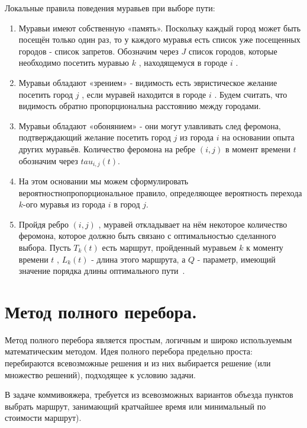 \documentclass[12pt]{report}
\begin{document}
    Локальные правила поведения муравьев при выборе пути:
    \begin{enumerate}
    	\item Муравьи имеют собственную «память». Поскольку каждый город может быть посещён только один раз, то у каждого муравья есть список уже посещенных городов - список запретов. Обозначим через $J$ список городов, которые необходимо посетить муравью $k$ , находящемуся в городе $i$ .
    	
    	\item Муравьи обладают «зрением» - видимость есть эвристическое желание посетить город $j$ , если муравей находится в городе $i$ . Будем считать, что видимость обратно пропорциональна расстоянию между городами.
    	
    	\item Муравьи обладают «обонянием» - они могут улавливать след феромона, подтверждающий желание посетить город $j$ из города $i$ на основании опыта других муравьёв. Количество феромона на ребре $(i,j)$ в момент времени $t$ обозначим через $tau _{i,j} (t)$.
    	
    	\item На этом основании мы можем сформулировать вероятностнопропорциональное правило, определяющее вероятность перехода $k$-ого муравья из города $i$ в город $j$.
    	
    	\item Пройдя ребро $(i,j)$ , муравей откладывает на нём некоторое количество феромона, которое должно быть связано с оптимальностью сделанного выбора. Пусть $T _{k} (t)$ есть маршрут, пройденный муравьем $k$ к моменту времени $t$ , $L _{k} (t)$ - длина этого маршрута, а $Q$ - параметр, имеющий значение порядка длины оптимального пути~\cite{3}.
    \end{enumerate} 

	\section{Метод полного перебора.}
	
	Метод полного перебора является простым, логичным и широко используемым	математическим методом.
	Идея полного перебора предельно проста: перебираются всевозможные решения и из них выбирается решение (или множество решений), подходящее к условию задачи.
	
	В задаче коммивояжера, требуется из всевозможных вариантов объезда пунктов выбрать маршрут, занимающий кратчайшее время или минимальный по стоимости маршрут).
	
\end{document}
